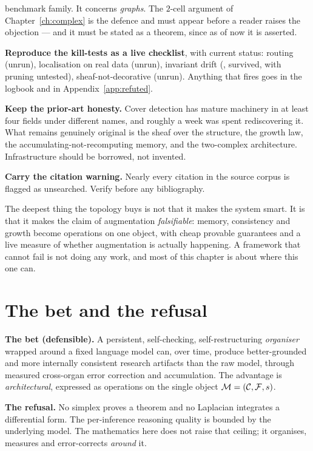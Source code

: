 \begin{workplan}{\Recast}
{    benchmark family. It concerns \emph{graphs}. The $2$-cell argument of
    Chapter~\ref{ch:complex} is the defence and must appear before a reader
    raises the objection --- and it must be stated as a theorem, since as of
    now it is asserted.
  \item \textbf{Reproduce the kill-tests as a live checklist}, with current
    status: routing (unrun), localisation on real data (unrun), invariant
    drift (\Measured, survived, with pruning untested), sheaf-not-decorative
    (unrun). Anything that fires goes in the logbook and in
    Appendix~\ref{app:refuted}.
  \item \textbf{Keep the prior-art honesty.} Cover detection has mature
    machinery in at least four fields under different names, and roughly a
    week was spent rediscovering it. What remains genuinely original is the
    sheaf over the structure, the growth law, the accumulating-not-recomputing
    memory, and the two-complex architecture. Infrastructure should be
    borrowed, not invented.
  \item \textbf{Carry the citation warning.} Nearly every citation in the
    source corpus is flagged as unsearched. Verify before any bibliography.
}

\end{workplan}

\begin{intu}\Intu
The deepest thing the topology buys is not that it makes the system
smart. It is that it makes the claim of augmentation \emph{falsifiable}:
memory, consistency and growth become operations on one object, with
cheap provable guarantees and a live measure of whether augmentation is
actually happening. A framework that cannot fail is not doing any work,
and most of this chapter is about where this one can.
\end{intu}

\section{The bet and the refusal}

\begin{hon}\Hon
\textbf{The bet (defensible).} A persistent, self-checking,
self-restructuring \emph{organiser} wrapped around a fixed language
model can, over time, produce better-grounded and more internally
consistent research artifacts than the raw model, through measured
cross-organ error correction and accumulation. The advantage is
\emph{architectural}, expressed as operations on the single object
$\mathcal{M}=(\mathcal{C},\mathcal{F},s)$.

\textbf{The refusal.} No simplex proves a theorem and no Laplacian
integrates a differential form. The per-inference reasoning quality is
bounded by the underlying model. The mathematics here does not raise
that ceiling; it organises, measures and error-corrects \emph{around}
it.
\end{hon}

